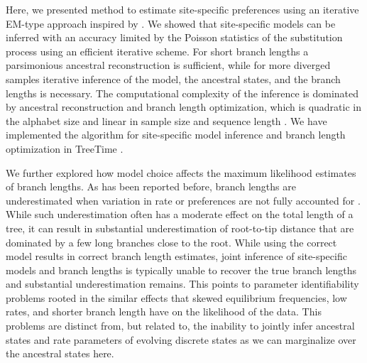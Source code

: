 \documentclass[aps,rmp,twocolumn,linenumbers]{revtex4-1}
\begin{document}
Here, we presented method to estimate site-specific preferences using an iterative EM-type approach inspired by \citet{bruno1996modeling}.
We showed that site-specific models can be inferred with an accuracy limited by the Poisson statistics of the substitution process using an efficient iterative scheme.
For short branch lengths a parsimonious ancestral reconstruction is sufficient, while for more diverged samples iterative inference of the model, the ancestral states, and the branch lengths is necessary.
The computational complexity of the inference is dominated by ancestral reconstruction and branch length optimization, which is quadratic in the alphabet size and linear in sample size and sequence length \citep{felsenstein2004inferring}.
We have implemented the algorithm for site-specific model inference and branch length optimization in TreeTime \citep{sagulenko2017treetime}.


We further explored how model choice affects the maximum likelihood estimates of branch lengths.
As has been reported before, branch lengths are underestimated when variation in rate or preferences are not fully accounted for \citep{halpern_evolutionary_1998,hilton_modeling_2018}.
While such underestimation often has a moderate effect on the total length of a tree, it can result in substantial underestimation of root-to-tip distance that are dominated by a few long branches close to the root.
While using the correct model results in correct branch length estimates, joint inference of site-specific models and branch lengths is typically unable to recover the true branch lengths and substantial underestimation remains.
This points to parameter identifiability problems rooted in the similar effects that skewed equilibrium frequencies, low rates, and shorter branch length have on the likelihood of the data.
This problems are distinct from, but related to, the inability to jointly infer ancestral states and rate parameters of evolving discrete states \citep{gascuel_darwinian_2020} as we can marginalize over the ancestral states here.
\end{document}
